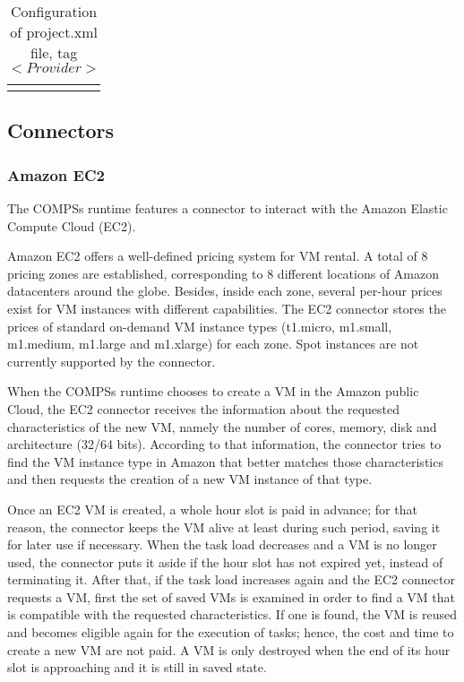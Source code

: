 \begin{longtable}{| p{} | p{} |}
\\
\hline
\caption{Configuration of project.xml file, tag $<Provider>$}
\label{tab:conf_project_xml_provider}
\end{longtable}


\subsection{Connectors}
\subsubsection{Amazon EC2}

The COMPSs runtime features a connector to interact with the Amazon Elastic Compute Cloud (EC2).

Amazon EC2 offers a well-defined pricing system for VM rental. A total of 8 pricing zones are 
established, corresponding to 8 different locations of Amazon datacenters around the globe. 
Besides, inside each zone, several per-hour prices exist for VM instances with different capabilities. 
The EC2 connector stores the prices of standard on-demand VM instance types (t1.micro, m1.small, 
m1.medium, m1.large and m1.xlarge) for each zone. Spot instances are not currently supported by the connector.

When the COMPSs runtime chooses to create a VM in the Amazon public Cloud, the EC2 connector receives 
the information about the requested characteristics of the new VM, namely the number of cores, memory, 
disk and architecture (32/64 bits). According to that information, the connector tries to find the VM 
instance type in Amazon that better matches those characteristics and then requests the creation of a 
new VM instance of that type.

Once an EC2 VM is created, a whole hour slot is paid in advance; for that reason, the connector keeps 
the VM alive at least during such period, saving it for later use if necessary. When the task load 
decreases and a VM is no longer used, the connector puts it aside if the hour slot has not expired yet, 
instead of terminating it. After that, if the task load increases again and the EC2 connector requests 
a VM, first the set of saved VMs is examined in order to find a VM that is compatible with the requested 
characteristics. If one is found, the VM is reused and becomes eligible again for the execution of tasks; 
hence, the cost and time to create a new VM are not paid. A VM is only destroyed when the end of its hour 
slot is approaching and it is still in saved state.

